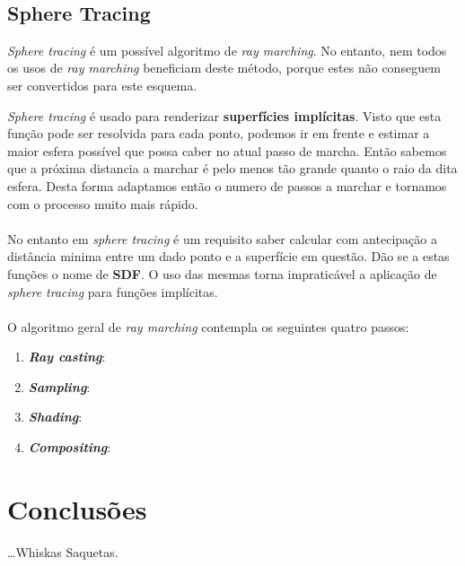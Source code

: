 \\

\subsection{Sphere Tracing}
\textit{Sphere tracing} é um possível algoritmo de \textit{ray marching}. No entanto, nem todos os usos de \textit{ray marching} beneficiam deste método, porque estes não conseguem ser convertidos para este esquema.

\textit{Sphere tracing} é usado para renderizar \textbf{superfícies implícitas}.
Visto que esta função pode ser resolvida para cada ponto, podemos ir em frente e estimar a maior esfera possível que possa caber no atual passo de marcha. Então sabemos que a próxima distancia a marchar é pelo menos tão grande quanto o raio da dita esfera. Desta forma adaptamos então o numero de passos a marchar e tornamos com o processo muito mais rápido.\\

\\

No entanto em \textit{sphere tracing} é um requisito saber calcular com antecipação a distância minima entre um dado ponto e a superfície em questão. Dão se a estas funções o nome de \textbf{\ac{SDF}}.
O uso das mesmas torna impraticável a aplicação de \textit{sphere tracing} para funções implícitas. \\

\\

O algoritmo geral de \textit{ray marching} contempla os seguintes quatro passos:

\begin{enumerate}
	\item \textbf{\textit{Ray casting}}:
	
	\item \textbf{\textit{Sampling}}:
	
	\item \textbf{\textit{Shading}}:
	
	\item \textbf{\textit{Compositing}}:
\end{enumerate}


\section{\opengl}
\label{sec::arte:opengl}



\section{Conclusões}
\label{sec::arte:conc}

\ldots Whiskas Saquetas.
